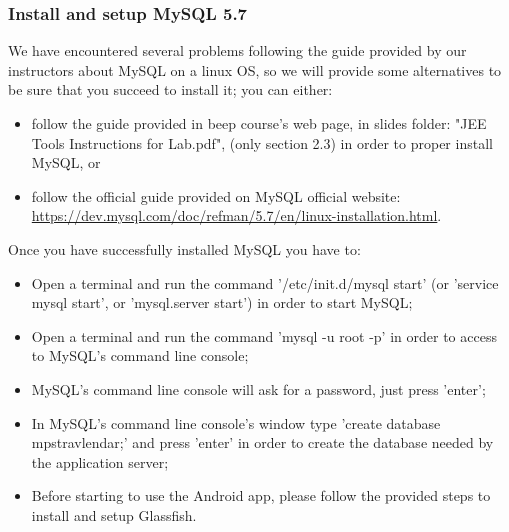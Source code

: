 \subsubsection{Install and setup MySQL 5.7}
We have encountered several problems following the guide provided by our instructors about MySQL on a linux OS, so we will provide some alternatives to be sure that you succeed to install it; you can either:
\begin{itemize}
	\item follow the guide provided in beep course's web page, in slides folder: "JEE Tools Instructions for Lab.pdf", (only section 2.3) in order to proper install MySQL, or
	\item follow the official guide provided on MySQL official website: \\ \href{https://dev.mysql.com/doc/refman/5.7/en/linux-installation.html}{\color{blue}https://dev.mysql.com/doc/refman/5.7/en/linux-installation.html}.
\end{itemize} 
Once you have successfully installed MySQL you have to:
\begin{itemize}
	\item Open a terminal and run the command '/etc/init.d/mysql start' (or 'service mysql start', or 'mysql.server start') in order to start MySQL;
	\item Open a terminal and run the command 'mysql -u root -p' in order to access to MySQL's command line console;
	\item MySQL's command line console will ask for a password, just press 'enter';
	\item In MySQL's command line console's window type 'create database mps\textunderscore travlendar;' and press 'enter' in order to create the database needed by the application server;
	\item Before starting to use the Android app, please follow the provided steps to install and setup Glassfish.
\end{itemize}

